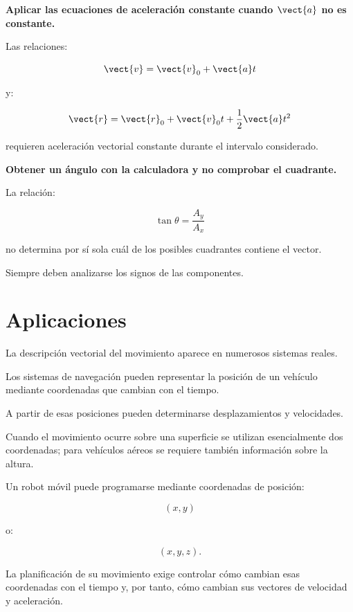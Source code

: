 \begin{errorfrecuente}
\textbf{Aplicar las ecuaciones de aceleración constante cuando
\(\vect{a}\) no es constante.}

Las relaciones:

\[
\vect{v}
=
\vect{v}_0+\vect{a}t
\]

y:

\[
\vect{r}
=
\vect{r}_0+\vect{v}_0t+\frac{1}{2}\vect{a}t^2
\]

requieren aceleración vectorial constante durante el intervalo considerado.
\end{errorfrecuente}


\begin{errorfrecuente}
\textbf{Obtener un ángulo con la calculadora y no comprobar el cuadrante.}

La relación:

\[
\tan\theta=\frac{A_y}{A_x}
\]

no determina por sí sola cuál de los posibles cuadrantes contiene el vector.

Siempre deben analizarse los signos de las componentes.
\end{errorfrecuente}


\section{Aplicaciones}

La descripción vectorial del movimiento aparece en numerosos sistemas reales.

\begin{aplicacion}
Los sistemas de navegación pueden representar la posición de un vehículo
mediante coordenadas que cambian con el tiempo.

A partir de esas posiciones pueden determinarse desplazamientos y velocidades.

Cuando el movimiento ocurre sobre una superficie se utilizan esencialmente dos
coordenadas; para vehículos aéreos se requiere también información sobre la
altura.
\end{aplicacion}


\begin{aplicacion}[Robótica]
Un robot móvil puede programarse mediante coordenadas de posición:

\[
(x,y)
\]

o:

\[
(x,y,z).
\]

La planificación de su movimiento exige controlar cómo cambian esas coordenadas
con el tiempo y, por tanto, cómo cambian sus vectores de velocidad y
aceleración.
\end{aplicacion}


